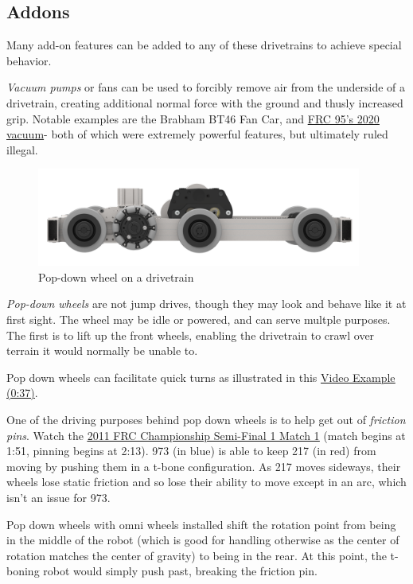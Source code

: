 \subsection{Addons}
Many add-on features can be added to any of these drivetrains to achieve special behavior.

\textit{Vacuum pumps} or fans can be used to forcibly remove air from the underside of a drivetrain, creating additional normal force with the ground and thusly increased grip. Notable examples are the Brabham BT46 Fan Car, and \href{https://www.youtube.com/watch?v=O9CEOHX88mw}{\color{red}\underline{FRC 95's 2020 vacuum}}- both of which were extremely powerful features, but ultimately ruled illegal. 

\begin{figure}[H]
	\includegraphics[width=0.95\textwidth]{imgs/drivetrain_popupwheel.png}
	\caption{Pop-down wheel on a drivetrain}
\end{figure}

\textit{Pop-down wheels} are not jump drives, though they may look and behave like it at first sight. The wheel may be idle or powered, and can serve multple purposes. The first is to lift up the front wheels, enabling the drivetrain to crawl over terrain it would normally be unable to.

Pop down wheels can facilitate quick turns as illustrated in this \href{https://youtu.be/PtRewwr59d8?t=37}{\color{red}\underline{Video Example (0:37)}}.

One of the driving purposes behind pop down wheels is to help get out of \textit{friction pins}. Watch the \href{https://youtu.be/kLAkcn6l9v0?t=133}{\color{red}\underline{2011 FRC Championship Semi-Final 1 Match 1}} (match begins at 1:51, pinning begins at 2:13). 973 (in blue) is able to keep 217 (in red) from moving by pushing them in a t-bone configuration. As 217 moves sideways, their wheels lose static friction and so lose their ability to move except in an arc, which isn't an issue for 973.

Pop down wheels with omni wheels installed shift the rotation point from being in the middle of the robot (which is good for handling otherwise as the center of rotation matches the center of gravity) to being in the rear. At this point, the t-boning robot would simply push past, breaking the friction pin.

